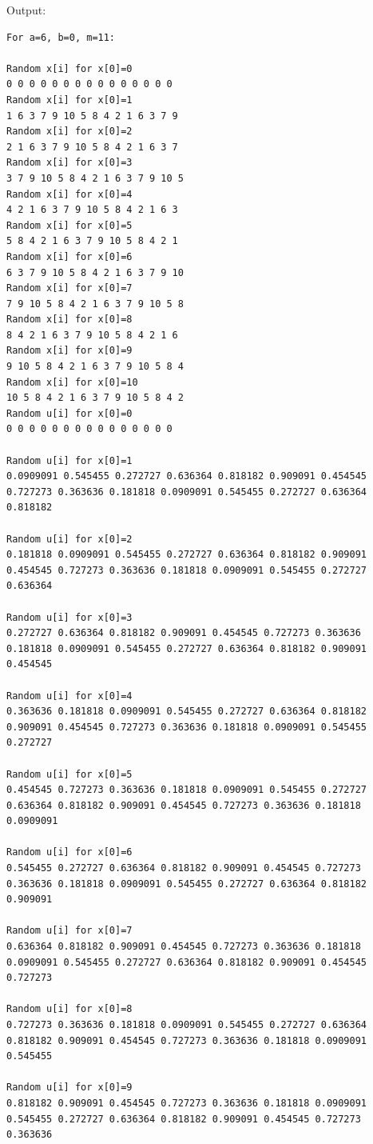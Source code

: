 \documentclass[11pt]{article}
\begin{document}
Output:
\begin{lstlisting}
For a=6, b=0, m=11:

Random x[i] for x[0]=0
0 0 0 0 0 0 0 0 0 0 0 0 0 0 0 
Random x[i] for x[0]=1
1 6 3 7 9 10 5 8 4 2 1 6 3 7 9 
Random x[i] for x[0]=2
2 1 6 3 7 9 10 5 8 4 2 1 6 3 7 
Random x[i] for x[0]=3
3 7 9 10 5 8 4 2 1 6 3 7 9 10 5 
Random x[i] for x[0]=4
4 2 1 6 3 7 9 10 5 8 4 2 1 6 3 
Random x[i] for x[0]=5
5 8 4 2 1 6 3 7 9 10 5 8 4 2 1 
Random x[i] for x[0]=6
6 3 7 9 10 5 8 4 2 1 6 3 7 9 10 
Random x[i] for x[0]=7
7 9 10 5 8 4 2 1 6 3 7 9 10 5 8 
Random x[i] for x[0]=8
8 4 2 1 6 3 7 9 10 5 8 4 2 1 6 
Random x[i] for x[0]=9
9 10 5 8 4 2 1 6 3 7 9 10 5 8 4 
Random x[i] for x[0]=10
10 5 8 4 2 1 6 3 7 9 10 5 8 4 2 
Random u[i] for x[0]=0
0 0 0 0 0 0 0 0 0 0 0 0 0 0 0 

Random u[i] for x[0]=1
0.0909091 0.545455 0.272727 0.636364 0.818182 0.909091 0.454545 0.727273 0.363636 0.181818 0.0909091 0.545455 0.272727 0.636364 0.818182 

Random u[i] for x[0]=2
0.181818 0.0909091 0.545455 0.272727 0.636364 0.818182 0.909091 0.454545 0.727273 0.363636 0.181818 0.0909091 0.545455 0.272727 0.636364 

Random u[i] for x[0]=3
0.272727 0.636364 0.818182 0.909091 0.454545 0.727273 0.363636 0.181818 0.0909091 0.545455 0.272727 0.636364 0.818182 0.909091 0.454545 

Random u[i] for x[0]=4
0.363636 0.181818 0.0909091 0.545455 0.272727 0.636364 0.818182 0.909091 0.454545 0.727273 0.363636 0.181818 0.0909091 0.545455 0.272727 

Random u[i] for x[0]=5
0.454545 0.727273 0.363636 0.181818 0.0909091 0.545455 0.272727 0.636364 0.818182 0.909091 0.454545 0.727273 0.363636 0.181818 0.0909091 

Random u[i] for x[0]=6
0.545455 0.272727 0.636364 0.818182 0.909091 0.454545 0.727273 0.363636 0.181818 0.0909091 0.545455 0.272727 0.636364 0.818182 0.909091 

Random u[i] for x[0]=7
0.636364 0.818182 0.909091 0.454545 0.727273 0.363636 0.181818 0.0909091 0.545455 0.272727 0.636364 0.818182 0.909091 0.454545 0.727273 

Random u[i] for x[0]=8
0.727273 0.363636 0.181818 0.0909091 0.545455 0.272727 0.636364 0.818182 0.909091 0.454545 0.727273 0.363636 0.181818 0.0909091 0.545455 

Random u[i] for x[0]=9
0.818182 0.909091 0.454545 0.727273 0.363636 0.181818 0.0909091 0.545455 0.272727 0.636364 0.818182 0.909091 0.454545 0.727273 0.363636 


\end{lstlisting}
\end{document}
